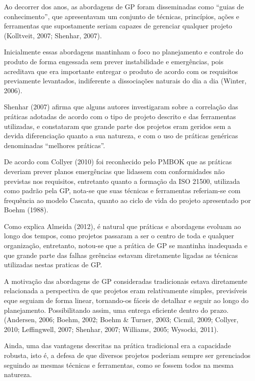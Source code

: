 Ao decorrer dos anos, as abordagens de GP foram disseminadas como “guias de conhecimento”, que apresentavam um conjunto de técnicas, princípios, ações e ferramentas que supostamente seriam capazes de gerenciar qualquer projeto (Kolltveit, 2007; Shenhar, 2007).

Inicialmente essas abordagens mantinham o foco no planejamento e controle do produto de forma engessada sem prever instabilidade e emergências, pois acreditava que era importante entregar o produto de acordo com os requisitos previamente levantados, indiferente a dissociações naturais do dia a dia (Winter, 2006).

Shenhar (2007) afirma que alguns autores investigaram sobre a correlação das práticas adotadas de acordo com o tipo de projeto descrito e das ferramentas utilizadas, e constataram que grande parte dos projetos eram geridos sem a devida diferenciação quanto a sua natureza, e com o uso de práticas genéricas denominadas “melhores práticas”.

De acordo com Collyer (2010) foi reconhecido pelo PMBOK que as práticas deveriam prever planos emergências que lidassem com conformidades não previstas nos requisitos, entretanto quanto a formação da ISO 21500, utilizada como padrão pela GP, nota-se que suas técnicas e ferramentas referiam-se com frequência ao modelo Cascata, quanto ao ciclo de vida do projeto apresentado por Boehm (1988).

Como explica Almeida (2012), é natural que práticas e abordagens evoluam ao longo dos tempos, como projetos passaram a ser o centro de toda e qualquer organização, entretanto, notou-se que a prática de GP se mantinha inadequada e que grande parte das falhas gerências estavam diretamente ligadas as técnicas utilizadas nestas praticas de GP.

A motivação das abordagens de GP consideradas tradicionais estava diretamente relacionada a perspectiva de que projetos eram relativamente simples, previsíveis eque seguiam de forma linear, tornando-os fáceis de detalhar e seguir ao longo do planejamento. Possibilitando assim, uma entrega eficiente dentro do prazo. (Andersen, 2006; Boehm, 2002; Boehm \& Turner, 2003; Cicmil, 2009; Collyer, 2010; Leffingwell, 2007; Shenhar, 2007; Williams, 2005; Wysocki, 2011).

Ainda, uma das vantagens descritas na prática tradicional era a capacidade robusta, isto é, a defesa de que diversos projetos poderiam sempre ser gerenciados seguindo as mesmas técnicas e ferramentas, como se fossem todos na mesma natureza.


